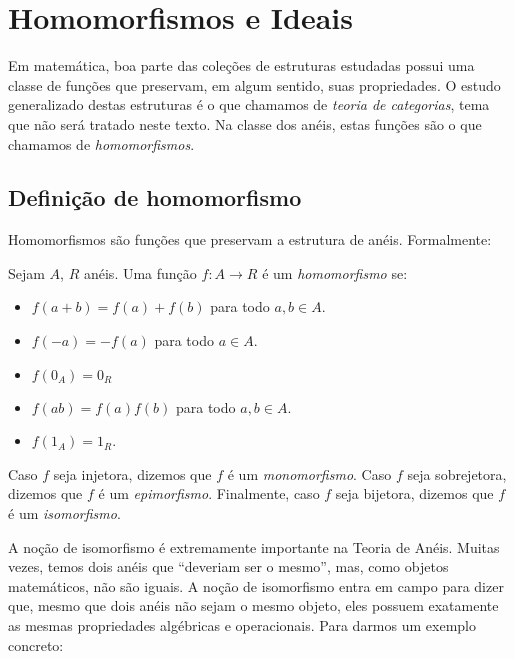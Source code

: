 \chapter{Homomorfismos e Ideais}
Em matemática, boa parte das coleções de estruturas estudadas possui uma classe de funções que preservam, em algum sentido, suas propriedades.
O estudo generalizado destas estruturas é o que chamamos de \emph{teoria de categorias}, tema que não será tratado neste texto.
Na classe dos anéis, estas funções são o que chamamos de \emph{homomorfismos}.
\section{Definição de homomorfismo}
Homomorfismos são funções que preservam a estrutura de anéis.
Formalmente:
\begin{definition}
Sejam $A$, $R$ anéis.
Uma função $f:A\rightarrow R$ é um \emph{homomorfismo} se:
\begin{itemize}
    \item $f(a+b)=f(a)+f(b)$ para todo $a, b \in A$.
    \item $f(-a)=-f(a)$ para todo $a \in A$.
    \item $f(0_A)=0_R$
    \item $f(ab)=f(a)f(b)$ para todo $a, b \in A$.
    \item $f(1_A)=1_R$.
\end{itemize}

Caso $f$ seja injetora, dizemos que $f$ é um \emph{monomorfismo}.
Caso $f$ seja sobrejetora, dizemos que $f$ é um \emph{epimorfismo}.
Finalmente, caso $f$ seja bijetora, dizemos que $f$ é um \emph{isomorfismo}.
\end{definition}

A noção de isomorfismo é extremamente importante na Teoria de Anéis. Muitas vezes, temos dois anéis que ``deveriam ser o mesmo'', mas, como objetos matemáticos, não são iguais. A noção de isomorfismo entra em campo para dizer que, mesmo que dois anéis não sejam o mesmo objeto, eles possuem exatamente as mesmas propriedades algébricas e operacionais. Para darmos um exemplo concreto:

